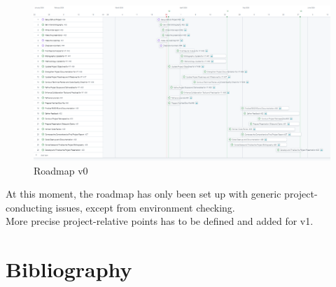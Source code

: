\documentclass[12pt]{article}
\begin{document}
\vspace{1cm}
\begin{figure}[h]
    \centering
    \includegraphics[width=\textwidth]{../../roadmap/roadmapv0-full.png}
    \caption{Roadmap v0}
    \label{fig:roadmapv0}
\end{figure}
\vspace{1cm}
At this moment, the roadmap has only been set up with generic project-conducting issues,
except from environment checking.\\
More precise project-relative points has to be defined and added for v1.

\newpage
\section{Bibliography}
\nocite{*}
\printbibliography[heading=none]
\end{document}
